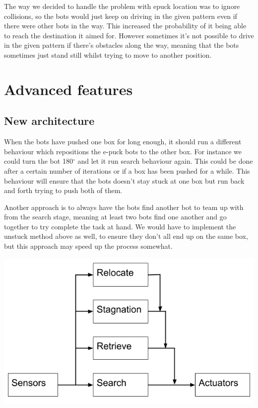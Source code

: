 \documentclass[12pt, a4paper]{article}
\begin{document}
The way we decided to handle the problem with epuck location was to ignore collisions, so the bots would just keep on driving in the given pattern even if there were other bots in the way. This increased the probability of it being able to reach the destination it aimed for. However sometimes it's not possible to drive in the given pattern if there's obstacles along the way, meaning that the bots sometimes just stand still whilst trying to move to another position.

\section{Advanced features}


\subsection{New architecture}
When the bots have pushed one box for long enough, it should run a different behaviour which repositions the e-puck bots to the other box. For instance we could turn the bot 180$^{\circ}$ and let it run search behaviour again. This could be done after a certain number of iterations or if a box has been pushed for a while. This behaviour will ensure that the bots doesn't stay stuck at one box but run back and forth trying to push both of them.

Another approach is to always have the bots find another bot to team up with from the search stage, meaning at least two bots find one another and go together to try complete the task at hand. We would have to implement the unstuck method above as well, to ensure they don't all end up on the same box, but this approach may speed up the process somewhat. 

\includegraphics[width=\linewidth]{Brooks-lite-extended.png}
\end{document}
